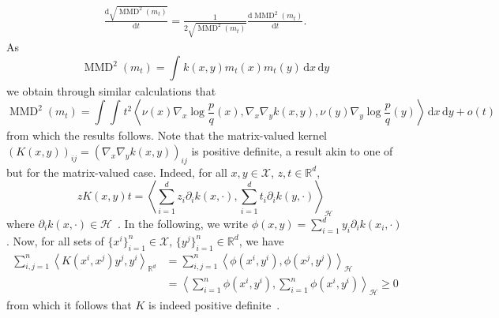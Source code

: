 \documentclass{uai2023} %
\begin{document}
\begin{equation*}
\begin{split}
\frac{\mathrm{d}\sqrt {\operatorname{MMD}^2(m_t)}  }{ \mathrm{d}t } = \frac{1}{2 \sqrt {\operatorname{MMD}^2(m_t)} } \frac{ \mathrm{d} \operatorname{MMD}^2(m_t)}{ \mathrm{d} t}.
\end{split}
\end{equation*}
As
\begin{equation*}
\operatorname{MMD}^2(m_t) = \int_{  }^{  } k(x, y) m_t(x) m_t(y) \,\mathrm{d}x \,\mathrm{d}y
\end{equation*}
we obtain through similar calculations that
\begin{equation*}
    \operatorname{MMD}^2(m_t) = \int_{  }^{  } \int_{  }^{  } t^2\left \langle  \nu(x)\nabla_{ x }\log \frac{ p }{ q }(x), \nabla_{ x }  \nabla_{ y }  k(x, y), \nu(y) \nabla_{ y } \log \frac{ p }{ q }(y) \right \rangle \,\mathrm{d}x \,\mathrm{d}y + o(t)
\end{equation*}
from which the results follows. Note that the matrix-valued kernel $ (K(x,
y))_{ij} = (\nabla_{x}  \nabla_{y}  k(x, y))_{ij}$ is positive
definite, a result akin to one of \citet{zhou2008derivative} but for the matrix-valued case.
Indeed, for all $ x, y \in
\mathcal  X $, $ z, t \in  \mathbb{R}^d $, 
\begin{equation*}
    z K(x, y)t = \left\langle \sum\limits_{i=1}^{d} z_i \partial_i k(x, \cdot), \sum\limits_{i=1}^{d} t_i \partial_i k(y, \cdot) \right \rangle_{\mathcal H} 
\end{equation*}
where $ \partial_i k(x, \cdot) \in \mathcal  H $~\citep{zhou2008derivative}.
In the following, we write $ \phi(x, y) = \sum_{i=1}^{d} y_i \partial_i
k(x_i, \cdot) $. Now, for all sets of $ \{ x^{i} \}_{i=1}^{n}
\in \mathcal  X  $,
$\{ y^{j} \}_{i=1}^{n} \in  \mathbb{R}^d$, we have
\begin{equation*}
\begin{split}
    \sum\limits_{ i, j=1 }^{ n } \left \langle K(x^i, x^j) y^j, y^i \right \rangle_{\mathbb{R}^d}
    &= \sum\limits_{ i, j=1 }^{ n } \left \langle \phi(x^i, y^i), \phi(x^j, y^j)  \right \rangle_{\mathcal  H} \\ 
    &=  \left \langle \sum\limits_{ i=1 }^{  n} \phi(x^i, y^i), \sum\limits_{ i=1 }^{ n } \phi(x^i, y^i) \right \rangle_{\mathcal  H}  \geq  0
\end{split}
\end{equation*}
from which it follows that $ K $ is indeed positive definite~\citep[Theorem
2.1]{micchelli2005learning}.
\end{document}

